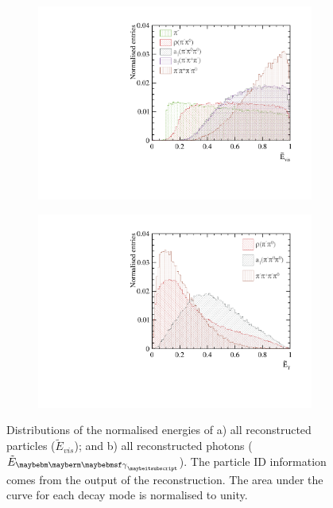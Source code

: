 \begin{figure}[htbp]
\centering
\begin{subfigure}[b]{0.45\textwidth}
 \includegraphics[width=\textwidth]{tau/var3/eVisRatio_100GeV_improved_zoom.pdf}
  \caption{}
  \label{fig:tauVarEVis}
\end{subfigure}
\begin{subfigure}[b]{0.45\textwidth}
 \includegraphics[width=\textwidth]{tau/var3/ePhotonRatio_100GeV_improved_zoom.pdf}
  \caption{}
  \label{fig:tauVarEPhoton}
\end{subfigure}
\caption
{Distributions of  the normalised energies of a) all reconstructed particles ($\tilde{E}_{vis}$); and b) all reconstructed  photons ($\tilde{E}_{\Pgg}$). The particle ID information comes from the output of the \pandora reconstruction. The area under the curve for each decay mode is normalised to unity.}
\label{fig:tauVar3}
\end{figure}

